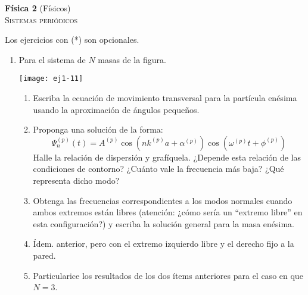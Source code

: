 \documentclass[11pt,spanish,a4paper]{article}
\begin{document}
\begin{center}
\textbf{Física 2} (Físicos) \hfill {}\\
	\textsc{\LARGE Sistemas periódicos}
\end{center}

Los ejercicios con (*) son opcionales.

\begin{enumerate}



\section*{Modos normales en sistemas periódicos}


\item
\begin{minipage}[t][1cm]{0.45\textwidth}
Para el sistema de $N$ masas de la figura. 
\end{minipage}
\begin{minipage}[c][1.5cm][t]{0.5\textwidth}
  \texttt{[image: ej1-11]}
\end{minipage}
\begin{enumerate}
	\item Escriba la ecuación de movimiento transversal para la partícula enésima usando la aproximación de ángulos pequeños.
	\item Proponga una solución de la forma:
	\[
		\Psi_{n}^{(p)}(t)=A^{(p)}\cos\left(nk^{(p)}a+\alpha^{(p)}\right)\cos\left(\omega^{(p)}t+\phi^{(p)}\right)
	\]
	Halle la relación de dispersión y grafíquela.
	¿Depende esta relación de las condiciones de contorno?
	¿Cuánto vale la frecuencia más baja?
	¿Qué representa dicho modo? 
	\item Obtenga las frecuencias correspondientes a los modos normales cuando ambos extremos están libres (atención: ¿cómo sería un ``extremo libre'' en esta configuración?) y escriba la solución general para la masa enésima. 
	\item Ídem. anterior, pero con el extremo izquierdo libre y el derecho fijo a la pared. 
	\item Particularice los resultados de los dos ítems anteriores para el caso en que $N=3$.
\end{enumerate}




\end{enumerate}
\end{document}
